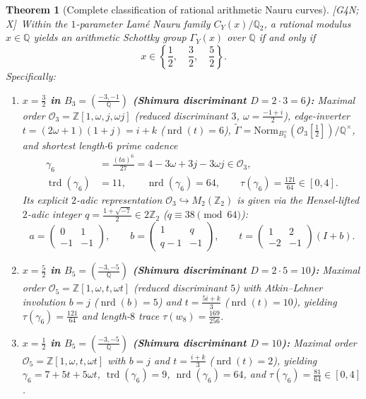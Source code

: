 \documentclass[11pt]{amsart}
\numberwithin{equation}{section}
\theoremstyle{plain}
\newtheorem{theorem}{Theorem}[section]
\theoremstyle{definition}\newtheorem{definition}[theorem]{Definition}
\theoremstyle{remark}\newtheorem{remark}[theorem]{Remark}
\newcommand{\Q}{\mathbb{Q}}
\newcommand{\Z}{\mathbb{Z}}
\newcommand{\calO}{\mathcal{O}}
\newcommand{\nrd}{\operatorname{nrd}}
\newcommand{\trd}{\operatorname{trd}}
\newcommand{\ctag}[1]{\textup{\textsf{\scriptsize[#1]}}}
\begin{document}
\begin{theorem}[Complete classification of rational arithmetic Nauru curves]\label{thm:rat_arith}
\ctag{G4N; X}\ Within the $1$-parameter Lam\'e Nauru family $C_Y(x)/\Q_2$, a rational modulus $x\in\Q$ yields an arithmetic Schottky group $\Gamma_Y(x)$ over $\Q$ if and only if
\[
x \in \left\{\frac{1}{2},\quad \frac{3}{2},\quad \frac{5}{2}\right\}.
\]
Specifically:
\begin{enumerate}[label=(\alph*),nosep]
\item \textbf{$x=\tfrac32$ in $B_3=(\frac{-3,-1}{\Q})$ (Shimura discriminant $D=2\cdot 3=6$):} Maximal order $\calO_3=\Z[1,\omega,j,\omega j]$ (reduced discriminant $3$, $\omega=\frac{-1+i}{2}$), edge-inverter $t=(2\omega+1)(1+j)=i+k$ ($\nrd(t)=6$), $\tilde{\Gamma}=\mathrm{Norm}_{B_3^\times}(\calO_3[\tfrac12])/\Q^\times$, and shortest length-$6$ prime cadence
\begin{align*}
\gamma_6 &= \frac{(ta)^6}{27} = 4 - 3\omega + 3j - 3\omega j \in \calO_3,\\
\trd(\gamma_6) &= 11,\qquad \nrd(\gamma_6) = 64,\qquad \tau(\gamma_6) = \frac{121}{64}\in [0,4].
\end{align*}
Its explicit $2$-adic representation $\calO_3\hookrightarrow M_2(\Z_2)$ is given via the Hensel-lifted $2$-adic integer $q=\frac{1+\sqrt{-7}}{2}\in 2\Z_2$ ($q\equiv 38\pmod{64}$):
\[
a = \begin{pmatrix}0 & 1 \\ -1 & -1\end{pmatrix}, \qquad b = \begin{pmatrix}1 & q \\ q-1 & -1\end{pmatrix}, \qquad t = \begin{pmatrix}1 & 2 \\ -2 & -1\end{pmatrix}(I+b).
\]
\item \textbf{$x=\tfrac52$ in $B_5=(\frac{-3,-5}{\Q})$ (Shimura discriminant $D=2\cdot 5=10$):} Maximal order $\calO_5=\Z[1,\omega,t,\omega t]$ (reduced discriminant $5$) with Atkin--Lehner involution $b=j$ ($\nrd(b)=5$) and $t=\frac{5i+k}{3}$ ($\nrd(t)=10$), yielding $\tau(\gamma_6)=\frac{121}{64}$ and length-$8$ trace $\tau(w_8)=\frac{169}{256}$.
\item \textbf{$x=\tfrac12$ in $B_5=(\frac{-3,-5}{\Q})$ (Shimura discriminant $D=10$):} Maximal order $\calO_5=\Z[1,\omega,t,\omega t]$ with $b=j$ and $t=\frac{i+k}{3}$ ($\nrd(t)=2$), yielding $\gamma_6 = 7 + 5t + 5\omega t$, $\trd(\gamma_6)=9$, $\nrd(\gamma_6)=64$, and $\tau(\gamma_6)=\frac{81}{64}\in [0,4]$.

\end{enumerate}
\end{theorem}
\end{document}
